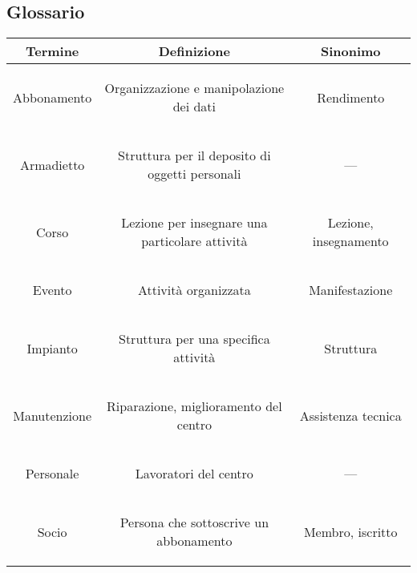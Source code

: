 \documentclass{article}
\begin{document}
\subsection{Glossario}
\begin{flushleft}
    \begin{tabular}{|c|c|c|}
        \hline
        Termine   &   Definizione   &   Sinonimo   \\
        \hline
        \begin{center}Abbonamento\end{center} & \begin{center}Organizzazione e manipolazione dei dati\end{center} & Rendimento \\  
        \hline
        \begin{center}Armadietto\end{center} & \begin{center}Struttura per il deposito di oggetti personali\end{center} & --- \\  
        \hline
        \begin{center}Corso\end{center} & \begin{center}Lezione per insegnare una particolare attività\end{center} & Lezione, insegnamento \\
        \hline
        \begin{center}Evento\end{center} & \begin{center}Attività organizzata\end{center} & Manifestazione \\
        \hline
       \begin{center}Impianto\end{center} & \begin{center}Struttura per una specifica attività\end{center} & Struttura \\
        \hline
        \begin{center}Manutenzione\end{center} & \begin{center}Riparazione, miglioramento del centro\end{center} & Assistenza tecnica \\
        \hline
        \begin{center}Personale\end{center} & \begin{center}Lavoratori del centro\end{center} & --- \\  
        \hline
        \begin{center}Socio\end{center} & \begin{center}Persona che sottoscrive un abbonamento\end{center} & Membro, iscritto \\  
        \hline
    \end{tabular}
\end{flushleft}
\end{document}
